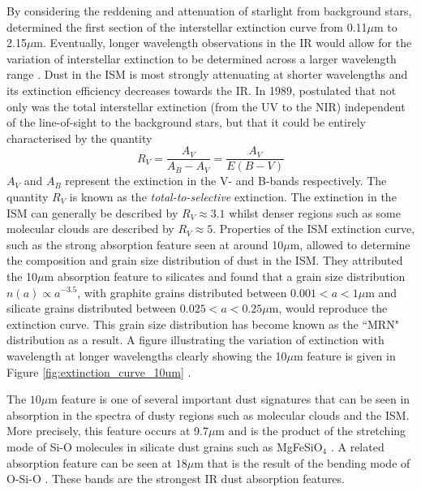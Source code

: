By considering the reddening and attenuation of starlight from background stars,  \citet{Bless1972} determined the first section of the interstellar extinction curve from 0.11$\mu$m to 2.15$\mu$m.  Eventually, longer wavelength observations in the IR would allow for the variation of interstellar extinction to be determined across a larger  wavelength range \citep{Rieke1985}.  Dust in the ISM is most strongly attenuating at shorter wavelengths and its extinction efficiency decreases towards the IR.  In 1989, \citeauthor*{Cardelli1989} postulated that not only was the total interstellar extinction (from the UV to the NIR) independent of the line-of-sight to the background stars, but that it could be entirely characterised by the quantity
\begin{equation}
R_V=\frac{A_V}{A_B-A_V}=\frac{A_V}{E(B-V)}
\end{equation}
\noindent $A_V$ and $A_B$ represent the extinction in the V- and B-bands respectively. The quantity $R_V$ is known as the {\em total-to-selective} extinction.  The extinction in the ISM can generally be described by $R_V\approx3.1$ whilst denser regions such as some molecular clouds are described by $R_V\approx5$.  Properties of the ISM extinction curve, such as the strong absorption feature seen at around 10$\mu$m, allowed \citet*{Mathis1977} to determine the composition and grain size distribution of dust in the ISM.  They attributed the 10$\mu$m absorption feature to silicates and found that a grain size distribution $n(a) \propto a^{-3.5}$, with graphite grains distributed between $0.001<a<1\mu$m and silicate grains distributed between $0.025<a<0.25\mu$m, would reproduce the extinction curve.  This grain size distribution has become known as the ``MRN" distribution as a result.  A figure illustrating the variation of extinction with wavelength at longer wavelengths clearly showing the 10$\mu$m feature is given in Figure \ref{fig:extinction_curve_10um} \citep{Weingartner2001,Draine2003}.  



The $10\mu$m feature is one of several important  dust signatures that can be seen in absorption in the spectra of dusty regions such as molecular clouds and the ISM.  More precisely, this feature occurs at 9.7$\mu$m and is the product of the stretching mode of Si-O molecules in silicate dust grains such as MgFeSiO$_4$ \citep{Draine2003}.  A related  absorption feature can be seen at $18\mu$m that is the result of the bending mode of O-Si-O \citep{McCarthy1980}.  These bands are the strongest IR dust absorption features.

